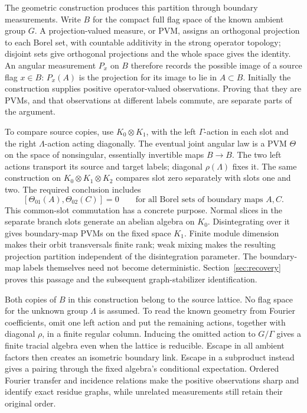 The geometric construction produces this partition through boundary
measurements. Write $B$ for the compact full flag space of the known
ambient group $G$. A projection-valued measure, or PVM, assigns an
orthogonal projection to each Borel set, with countable additivity in
the strong operator topology; disjoint sets give orthogonal projections
and the whole space gives the identity. An angular measurement $P_x$
on $B$ therefore records the possible image of a source flag $x\in B$:
$P_x(A)$ is the projection for its image to lie in $A\subset B$.
Initially the construction supplies positive operator-valued
observations. Proving that they are PVMs, and that observations at
different labels commute, are separate parts of the argument.

To compare source copies, use $K_0\otimes K_1$, with the left
$\Gamma$-action in each slot and the right $\Lambda$-action acting
diagonally. The eventual joint angular law is a PVM $\Theta$ on the
space of nonsingular, essentially invertible maps $B\to B$. The two
left actions transport its source and target labels; diagonal
$\rho(\Lambda)$ fixes it. The same construction on
$K_0\otimes K_1\otimes K_2$ compares slot zero separately with slots
one and two. The required conclusion includes
\[
 [\Theta_{01}(A),\Theta_{02}(C)]=0
 \qquad\text{for all Borel sets of boundary maps }A,C.
\]
This common-slot commutation has a concrete purpose. Normal slices in
the separate branch slots generate an abelian algebra on $K_0$.
Disintegrating over it gives boundary-map PVMs on the fixed space $K_1$.
Finite module dimension makes their orbit transversals finite rank;
weak mixing makes the resulting projection partition independent of
the disintegration parameter. The boundary-map labels themselves need
not become deterministic. Section~\ref{sec:recovery} proves this passage
and the subsequent graph-stabilizer identification.

Both copies of $B$ in this construction belong to the source lattice.
No flag space for the unknown group $\Lambda$ is assumed. To read the
known geometry from Fourier coefficients, omit one left action and put
the remaining actions, together with diagonal $\rho$, in a finite
regular column. Inducing the omitted action to $G/\Gamma$ gives a
finite tracial algebra even when the lattice is reducible. Escape in
all ambient factors then creates an isometric boundary link. Escape
in a subproduct instead gives a pairing through the fixed algebra's
conditional expectation. Ordered Fourier transfer and incidence
relations make the positive observations sharp and identify exact
residue graphs, while unrelated measurements still retain their
original order.

